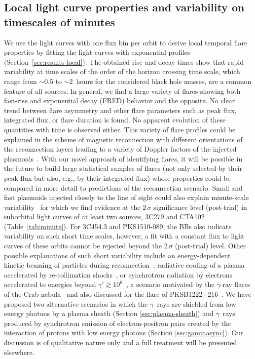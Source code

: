 \documentclass[twocolumn,linenumbers]{aastex62}
\newcommand{\Grays}{$\gamma$~rays\xspace}
\newcommand{\gray}{$\gamma$-ray\xspace}
\begin{document}
\subsection{Local light curve properties and variability on timescales of minutes}
We use the light curves with one flux bin per orbit to derive local temporal flare properties by fitting the light curves with exponential  profiles (Section~\ref{sec:results-local}).
The obtained rise and decay times show that rapid variability at time scales of the order of the horizon crossing time scale, which range from $\sim 0.5$ to $\sim 2$ \,hours for the considered black hole masses, are a common feature of all sources.
In general, we find a large variety of flares showing both fast-rise and exponential decay (FRED) behavior and the opposite. 
No clear trend between flare asymmetry and other flare parameters such as peak flux, integrated flux, or flare duration is found. 
No apparent evolution of these quantities with time is observed either. 
This variety of flare profiles could be explained in the scheme of magnetic reconnection with different orientations of the reconnection layers leading to a variety of Doppler factors of the injected plasmoids~\citep[e.g.,][]{2016MNRAS.462.3325P,2018MNRAS.tmp.2522C}. 
With our novel approach of identifying flares, it will be possible in the future to build large statistical samples of flares (not only selected by their peak flux but also, e.g., by their integrated flux) whose properties could be compared in more detail to predictions of the reconnection scenario.
Small and fast plasmoids injected closely to the line of sight could also explain minute-scale variability~\citep{2016MNRAS.462.3325P} for which we find evidence at the 2\,$\sigma$ significance level (post-trial) in suborbital light curves of at least two sources, 3C279 and CTA102 (Table~\ref{tab:minute}). 
For 3C454.3 and PKS1510-089, the BBs also indicate variability on such short time scales, however, a fit with a constant flux to light curves of these orbits cannot be rejected beyond the $2\,\sigma$ (post-trial) level.
Other possible explanations of such short variability include an energy-dependent kinetic beaming of particles during reconnection~\citep{2012ApJ...754L..33C}, radiative cooling of a plasma accelerated by re-collimation shocks~\citep{Bodo:2017qqn}, or synchrotron radiation by electrons accelerated to energies beyond $\gamma' \gtrsim 10^6$~\citep{TheFermi-LAT:2016dss}, a scenario motivated by the \gray flares of the Crab nebula~\citep{2011Sci...331..739A} and also discussed for the flare of PKSB1222+216~\citep{2012MNRAS.425.2519N}.
We have proposed two alternative scenarios in which the \Grays are shielded from low energy photons by a plasma sheath (Section \ref{sec:plasma-sheath}) and \Grays produced by synchrotron emission of electron-positron pairs created by the interaction of protons with low energy photons (Section \ref{sec:gammasync}). Our discussion is of qualitative nature only and a full treatment will be presented elsewhere. 
\end{document}
